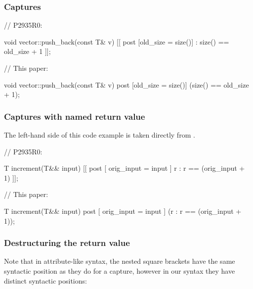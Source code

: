 \subsubsection{Captures}

\begin{minipage}{8cm}
\begin{codeblock}
// P2935R0:

void vector::push_back(const T& v)
  [[ post [old_size = size()]
    : size() == old_size + 1 ]];
\end{codeblock}
\end{minipage}
\begin{minipage}{8cm}
\begin{codeblock}
// This paper:

void vector::push_back(const T& v)
  post [old_size = size()] 
    (size() == old_size + 1);
\end{codeblock}
\end{minipage}


\subsubsection{Captures with named return value}

The left-hand side of this code example is taken directly from \cite{P2935R0}.
\\

\begin{minipage}{8cm}
\begin{codeblock}
// P2935R0:

T increment(T&& input)
  [[ post [ orig_input = input ]
    r : r == (orig_input + 1) ]];
\end{codeblock}
\end{minipage}
\begin{minipage}{8cm}
\begin{codeblock}
// This paper:

T increment(T&& input)
  post [ orig_input = input ]
    (r : r == (orig_input + 1));
\end{codeblock}
\end{minipage}

\subsubsection{Destructuring the return value}
\label{subsubsec:struct}

Note that in attribute-like syntax, the nested square brackets have the same syntactic position as they do for a capture, however in our syntax they have distinct syntactic positions:
\\

